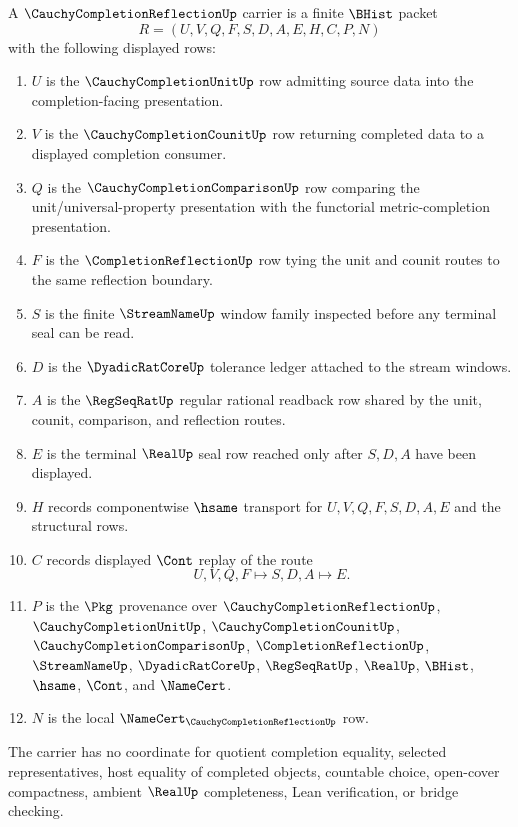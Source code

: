 \begin{definition}
\label{def:cauchy-completion-reflection-carrier}
A $\CauchyCompletionReflectionUp$ carrier is a finite $\BHist$ packet
$$
R=(U,V,Q,F,S,D,A,E,H,C,P,N)
$$
with the following displayed rows:
\begin{enumerate}
\item $U$ is the $\CauchyCompletionUnitUp$ row admitting source data into the completion-facing presentation.
\item $V$ is the $\CauchyCompletionCounitUp$ row returning completed data to a displayed completion consumer.
\item $Q$ is the $\CauchyCompletionComparisonUp$ row comparing the unit/universal-property presentation with the functorial metric-completion presentation.
\item $F$ is the $\CompletionReflectionUp$ row tying the unit and counit routes to the same reflection boundary.
\item $S$ is the finite $\StreamNameUp$ window family inspected before any terminal seal can be read.
\item $D$ is the $\DyadicRatCoreUp$ tolerance ledger attached to the stream windows.
\item $A$ is the $\RegSeqRatUp$ regular rational readback row shared by the unit, counit, comparison, and reflection routes.
\item $E$ is the terminal $\RealUp$ seal row reached only after $S,D,A$ have been displayed.
\item $H$ records componentwise $\hsame$ transport for $U,V,Q,F,S,D,A,E$ and the structural rows.
\item $C$ records displayed $\Cont$ replay of the route
$$
U,V,Q,F \longmapsto S,D,A \longmapsto E .
$$
\item $P$ is the $\Pkg$ provenance over $\CauchyCompletionReflectionUp$, $\CauchyCompletionUnitUp$, $\CauchyCompletionCounitUp$, $\CauchyCompletionComparisonUp$, $\CompletionReflectionUp$, $\StreamNameUp$, $\DyadicRatCoreUp$, $\RegSeqRatUp$, $\RealUp$, $\BHist$, $\hsame$, $\Cont$, and $\NameCert$.
\item $N$ is the local $\NameCert_{\CauchyCompletionReflectionUp}$ row.
\end{enumerate}
The carrier has no coordinate for quotient completion equality, selected representatives, host equality of completed objects, countable choice, open-cover compactness, ambient $\RealUp$ completeness, Lean verification, or bridge checking.
\end{definition}

